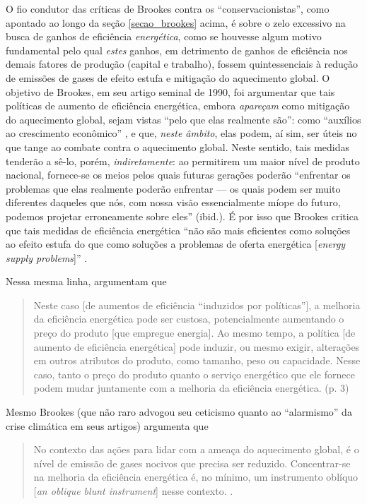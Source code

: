 O fio condutor das críticas de Brookes contra os ``conservacionistas'', como apontado ao longo da seção \ref{secao_brookes} acima, é sobre o zelo excessivo na busca de ganhos de eficiência \textit{energética}, como se houvesse algum motivo fundamental pelo qual \textit{estes} ganhos, em detrimento de ganhos de eficiência nos demais fatores de produção (capital e trabalho), fossem quintessenciais à redução de emissões de gases de efeito estufa e mitigação do aquecimento global. O objetivo de Brookes, em seu artigo seminal de 1990, foi argumentar que tais políticas de aumento de eficiência energética, embora \textit{apareçam} como mitigação do aquecimento global, sejam vistas ``pelo que elas realmente são'': como ``auxílios ao crescimento econômico'' \parencite[p. 319]{Brookes1990}, e que, \textit{neste âmbito}, elas podem, aí sim, ser úteis no que tange ao combate contra o aquecimento global. Neste sentido, tais medidas tenderão a sê-lo, porém, \textit{indiretamente}: ao permitirem um maior nível de produto nacional, fornece-se os meios pelos quais futuras gerações poderão ``enfrentar os problemas que elas realmente poderão enfrentar --- os quais podem ser muito diferentes daqueles que nós, com nossa visão essencialmente míope do futuro, podemos projetar erroneamente sobre eles'' (ibid.). É por isso que Brookes critica que tais medidas de eficiência energética ``não são mais eficientes como soluções ao efeito estufa do que como soluções a problemas de oferta energética [\textit{energy supply problems}]'' \parencite[p. 320]{Brookes1990}. 

Nessa mesma linha, \textcite{Gillingham2015} argumentam que
\begin{quote}
    Neste caso [de aumentos de eficiência ``induzidos por políticas''], a melhoria da eficiência energética pode ser custosa, potencialmente aumentando o preço do produto [que empregue energia]. Ao mesmo tempo, a política [de aumento de eficiência energética] pode induzir, ou mesmo exigir, alterações em outros atributos do produto, como tamanho, peso ou capacidade. Nesse caso, tanto o preço do produto quanto o serviço energético que ele fornece podem mudar juntamente com a melhoria da eficiência energética. (p. 3)
\end{quote}

Mesmo Brookes (que não raro advogou seu ceticismo quanto ao ``alarmismo'' da crise climática em seus artigos) argumenta que 
\begin{quote}
    No contexto das ações para lidar com a ameaça do aquecimento global, é o nível de emissão de gases nocivos que precisa ser reduzido. Concentrar-se na melhoria da eficiência energética é, no mínimo, um instrumento oblíquo [\textit{an oblique blunt instrument}] nesse contexto. \parencite[p. 365]{Brookes2000}. 
\end{quote}

